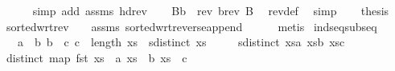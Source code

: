 \begin{isabellebody}
\ \ \ \ \isamarkupfalse%
\ {\isacharparenleft}{\kern0pt}simp\ add{\isacharcolon}{\kern0pt}\ assms{\isacharparenleft}{\kern0pt}{}{\isacharparenright}{\kern0pt}\ hd{\isacharunderscore}{\kern0pt}rev{\isacharparenright}{\kern0pt}\isanewline
\ \ \isamarkupfalse%
\ {}{\isacharcolon}{\kern0pt}{\isachardoublequoteopen}B{\isacharat}{\kern0pt}{\isacharbrackleft}{\kern0pt}b{\isacharbrackright}{\kern0pt}\ {\isacharequal}{\kern0pt}\ rev\ {\isacharparenleft}{\kern0pt}b{\isacharhash}{\kern0pt}{\isacharparenleft}{\kern0pt}rev\ B{\isacharparenright}{\kern0pt}{\isacharparenright}{\kern0pt}{\isachardoublequoteclose}\ \isamarkupfalse%
\ rev{\isacharunderscore}{\kern0pt}def\ \isamarkupfalse%
\ simp\isanewline
\ \ \isamarkupfalse%
\ {\isacharquery}{\kern0pt}thesis\ \isamarkupfalse%
\ sorted{\isacharunderscore}{\kern0pt}wrt{\isacharunderscore}{\kern0pt}rev\ {}\ {}\ {}\ assms\ sorted{\isacharunderscore}{\kern0pt}wrt{\isacharunderscore}{\kern0pt}reverse{\isacharunderscore}{\kern0pt}append\isanewline
\ \ \ \ \isamarkupfalse%
\ metis\isanewline
{}\isamarkupfalse%
%
\endisatagproof
{\isafoldproof}%
%
\isadelimproof
\isanewline
%
\endisadelimproof
\isanewline
\isanewline
{}\isamarkupfalse%
\ ind{\isacharunderscore}{\kern0pt}seq{\isacharunderscore}{\kern0pt}subseq{\isacharcolon}{\kern0pt}\isanewline
\ \ \ {\isachardoublequoteopen}a\ {\isacharless}{\kern0pt}\ b{\isachardoublequoteclose}\ {\isachardoublequoteopen}b\ {\isacharless}{\kern0pt}\ c{\isachardoublequoteclose}\ {\isachardoublequoteopen}c\ {\isacharless}{\kern0pt}\ length\ xs{\isachardoublequoteclose}\ \ {\isachardoublequoteopen}sdistinct\ xs{\isachardoublequoteclose}\isanewline
\ \ \ \ \ {\isachardoublequoteopen}sdistinct\ {\isacharbrackleft}{\kern0pt}xs{\isacharbang}{\kern0pt}a{\isacharcomma}{\kern0pt}\ xs{\isacharbang}{\kern0pt}b{\isacharcomma}{\kern0pt}\ xs{\isacharbang}{\kern0pt}c{\isacharbrackright}{\kern0pt}{\isachardoublequoteclose}\isanewline
%
\isadelimproof
%
\endisadelimproof
%
\isatagproof
{}\isamarkupfalse%
\isanewline
\ \ \isamarkupfalse%
\ {\isachardoublequoteopen}distinct\ {\isacharparenleft}{\kern0pt}map\ fst\ {\isacharbrackleft}{\kern0pt}xs\ {\isacharbang}{\kern0pt}\ a{\isacharcomma}{\kern0pt}\ xs\ {\isacharbang}{\kern0pt}\ b{\isacharcomma}{\kern0pt}\ xs\ {\isacharbang}{\kern0pt}\ c{\isacharbrackright}{\kern0pt}{\isacharparenright}{\kern0pt}{\isachardoublequoteclose}\ \isamarkupfalse%

\end{isabellebody}

